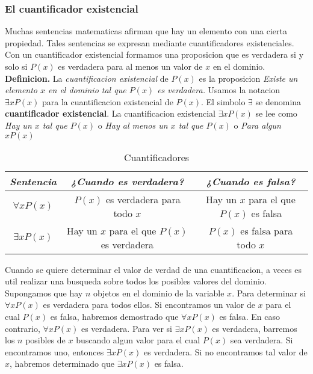 \documentclass[]{article}
\begin{document}
\subsubsection*{El cuantificador existencial}\label{sec:cuantificador-existencial}

Muchas sentencias matematicas afirman que hay un elemento con una cierta propiedad. Tales sentencias se expresan mediante cuantificadores existenciales. Con un cuantificador existencial formamos una proposicion que es verdadera si y solo si $P(x)$ es verdadera para al menos un valor de $x$ en el dominio.\\

\textbf{Definicion.} La \textit{cuantificacion existencial} de $P(x)$ es la proposicion \textit{Existe un elemento $x$ en el dominio tal que $P(x)$ es verdadera.} Usamos la notacion $\exists x P(x)$ para la cuantificacion existencial de $P(x)$. El simbolo $\exists$ se denomina \textbf{cuantificador existencial}. La cuantificacion existencial $\exists x P(x)$ se lee como \textit{Hay un $x$ tal que $P(x)$} o \textit{Hay al menos un $x$ tal que $P(x)$} o \textit{Para algun $x P(x)$}

\begin{table}[H]
	\caption*{Cuantificadores}
	\begin{center}
		\begin{tabular}{|c|c|c|}
			\hline
			\textit{Sentencia} & \textit{¿Cuando es verdadera?} & \textit{¿Cuando es falsa?}\\
			\hline
			$\forall x P(x)$ & $P(x)$ es verdadera para todo $x$ & Hay un $x$ para el que $P(x)$ es falsa\\
			\hline
			$\exists x P(x)$ & Hay un $x$ para el que $P(x)$ es verdadera & $P(x)$ es falsa para todo $x$\\
			\hline
		\end{tabular}
	\end{center}
\end{table}

Cuando se quiere determinar el valor de verdad de una cuantificacion, a veces es util realizar una busqueda sobre todos los posibles valores del dominio. Supongamos que hay $n$ objetos en el dominio de la variable $x$. Para determinar si $\forall xP(x)$ es verdadera para todos ellos. Si encontramos un valor de $x$ para el cual $P(x)$ es falsa, habremos demostrado que $\forall xP(x)$ es falsa. En caso contrario, $\forall xP(x)$ es verdadera. Para ver si $\exists x P(x)$ es verdadera, barremos los $n$ posibles de $x$ buscando algun valor para el cual $P(x)$ sea verdadera. Si encontramos uno, entonces $\exists x P(x)$ es verdadera. Si no encontramos tal valor de $x$, habremos determinado que $\exists x P(x)$ es falsa.
\end{document}
